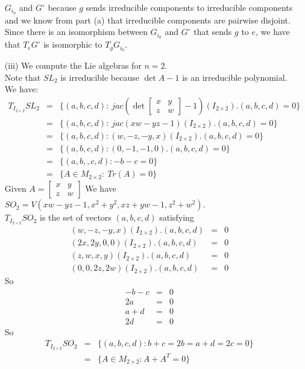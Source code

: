 \documentclass[12pt]{article}
\begin{document}
\begin{enumerate}
$G_{i_0}$ and $G^{\circ}$ because $g$ sends irreducible components to irreducible components and we know from part (a) that irreducible components are pairwise disjoint.
\\
Since there is an isomorphism between $G_{i_0}$ and $G^{\circ}$ that sends $g$ to $e$, we have that $T_eG^{\circ}$ is isomorphic to $T_gG_{i_0}$.
\clearpage
\item[(iii)] We compute the Lie algebras for $n=2$. \\
Note that $SL_2$ is irreducible because $\det A -1$ is an irreducible polynomial. We have: 
\begin{eqnarray*}
T_{I_{2 \times 2}} SL_2&=&
\{
(a,b,c,d): \ jac(\det 
\begin{bmatrix}
x & y \\
z & w
\end{bmatrix}
-1)(I_{2 \times 2}).(a,b,c,d)=0
\}
\\ &=&
\{
(a,b,c,d): \ jac(xw-yz-1)(I_{2 \times 2}).(a,b,c,d)=0
\}
\\ &=&
\{
(a,b,c,d): (w,-z,-y,x)(I_{2 \times 2}).(a,b,c,d)=0
\}
\\ &=&
\{
(a,b,c,d): (0,-1,-1,0).(a,b,c,d)=0
\}
\\ &=&
\{
(a,b,,c,d) : -b-c =0
\} 
\\ &=&
\{
A \in M_{2\times 2}: \ Tr(A)=0
\}
\end{eqnarray*}
Given $A=
\begin{bmatrix}
x & y \\
z & w
\end{bmatrix}$
We have $SO_2=V(xw-yz-1,x^2+y^2,xz+yw-1,z^2+w^2)$. \\
$T_{I_{2 \times 2}}SO_2$ is the set of vectors $(a,b,c,d)$ satisfying 
\begin{eqnarray*}
(w,-z,-y,x)(I_{2 \times 2}).(a,b,c,d) &= &0 \\
(2x,2y,0,0)(I_{2 \times 2}).(a,b,c,d) &=& 0 \\
(z,w,x,y)(I_{2 \times 2}).(a,b,c,d) &=& 0 \\
(0,0,2z,2w)(I_{2 \times 2}).(a,b,c,d) &=& 0
\end{eqnarray*}
So 
\begin{eqnarray*}
-b-c &=& 0\\
2a &=& 0 \\
a+d &=& 0 \\
2d &=& 0
\end{eqnarray*}
So
\begin{eqnarray*}
T_{I_{2 \times 2}}SO_2 &=&
\{ (a,b,c,d): 
b+c=2b=a+d=2c=0
\}
\\ &=&
\{A \in M_{2 \times 2}: A+A^T=0\}
\end{eqnarray*}



\end{enumerate}
\end{document}
